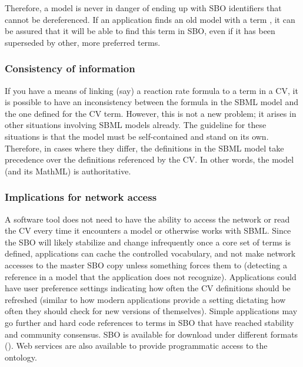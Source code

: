 Therefore, a model is never in danger of ending up with SBO
identifiers that cannot be dereferenced.  If an application finds
an old model with a term , it can be assured
that it will be able to find this term in SBO, even if it has been
superseded by other, more preferred terms.


\subsubsection{Consistency of information}

If you have a means of linking (say) a reaction rate formula to a
term in a CV, it is possible to have an inconsistency between the
formula in the SBML model and the one defined for the CV term.
However, this is not a new problem; it arises in other situations
involving SBML models already.  The guideline for these situations
is that the model must be self-contained and stand on its own.
Therefore, in cases where they differ, the definitions in the SBML
model take precedence over the definitions referenced by the CV.
In other words, the model (and its MathML) is authoritative.


\subsubsection{Implications for network access}
\label{sec:sbo-implications-for-network-access}

\begin{blockChanged}

A software tool does not need to have the ability to access the
network or read the CV every time it encounters a model or
otherwise works with SBML.  Since the SBO will likely stabilize
and change infrequently once a core set of terms is defined,
applications can cache the controlled vocabulary, and not make
network accesses to the master SBO copy unless something forces
them to (\eg detecting a reference in a model  that
the application does not recognize).  Applications could have user
preference settings indicating how often the CV definitions should
be refreshed (similar to how modern applications provide a setting
dictating how often they should check for new versions of
themselves).  Simple applications may go further and hard code
references to terms in SBO that have reached stability and
community consensus. SBO is available for download under different
formats (\sboref).  Web services are also available to provide
programmatic access to the ontology.

\end{blockChanged}



